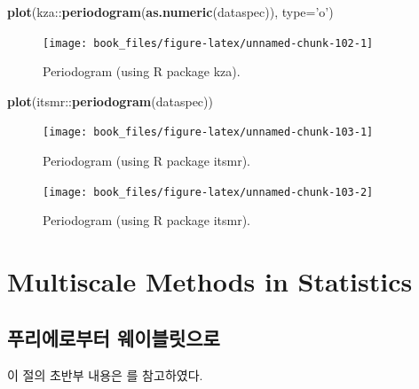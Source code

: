 \documentclass[b5paper,]{scrbook}
\makeatletter
\newenvironment{Shaded}{\begin{snugshade}}{\end{snugshade}}
\newcommand{\KeywordTok}[1]{\textcolor[rgb]{0.13,0.29,0.53}{\textbf{{#1}}}}
\newcommand{\DataTypeTok}[1]{\textcolor[rgb]{0.13,0.29,0.53}{{#1}}}
\newcommand{\StringTok}[1]{\textcolor[rgb]{0.31,0.60,0.02}{{#1}}}
\newcommand{\NormalTok}[1]{{#1}}
\theoremstyle{plain}
\theoremstyle{definition}
\numberwithin{equation}{section}
\newenvironment{kframe}{%
\medskip{}
\setlength{\fboxsep}{.8em}
 \def\at@end@of@kframe{}%
 \ifinner\ifhmode%
  \def\at@end@of@kframe{\end{minipage}}%
  \begin{minipage}{\columnwidth}%
 \fi\fi%
 \def\FrameCommand##1{\hskip\@totalleftmargin \hskip-\fboxsep
 \colorbox{shadecolor}{##1}\hskip-\fboxsep
     \hskip-\linewidth \hskip-\@totalleftmargin \hskip\columnwidth}%
 \MakeFramed {\advance\hsize-\width
   \@totalleftmargin\z@ \linewidth\hsize
   \@setminipage}}%
 {\par\unskip\endMakeFramed%
 \at@end@of@kframe}
\renewenvironment{Shaded}{\begin{kframe}}{\end{kframe}}
\makeatother
\begin{document}
\begin{Shaded}
\begin{Highlighting}[]
\KeywordTok{plot}\NormalTok{(kza::}\KeywordTok{periodogram}\NormalTok{(}\KeywordTok{as.numeric}\NormalTok{(dataspec)), }\DataTypeTok{type=}\StringTok{'o'}\NormalTok{)}
\end{Highlighting}
\end{Shaded}

\begin{figure}

{\centering \texttt{[image: book\_files/figure-latex/unnamed-chunk-102-1]} 

}

\caption{Periodogram (using R package kza).}\label{fig:unnamed-chunk-102}
\end{figure}

\begin{Shaded}
\begin{Highlighting}[]
\KeywordTok{plot}\NormalTok{(itsmr::}\KeywordTok{periodogram}\NormalTok{(dataspec))}
\end{Highlighting}
\end{Shaded}

\begin{figure}

{\centering \texttt{[image: book\_files/figure-latex/unnamed-chunk-103-1]} 

}

\caption{Periodogram (using R package itsmr).}\label{fig:unnamed-chunk-1031}
\end{figure}\begin{figure}

{\centering \texttt{[image: book\_files/figure-latex/unnamed-chunk-103-2]} 

}

\caption{Periodogram (using R package itsmr).}\label{fig:unnamed-chunk-1032}
\end{figure}

\part{Multiscale Methods in
Statistics}\label{part-multiscale-methods-in-statistics}

\chapter{푸리에로부터 웨이블릿으로}\label{fouriertowavelet}

이 절의 초반부 내용은 \citep{Ogden2012}를 참고하였다.
\end{document}
